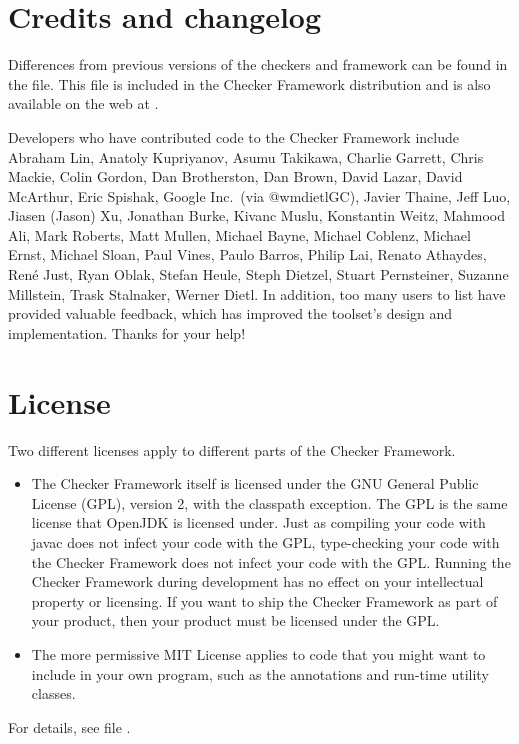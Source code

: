 \section{Credits and changelog\label{credits}}

Differences from previous versions of the checkers and framework can be found
in the  file.  This file is included in the
Checker Framework distribution and is also available on the web at
.

Developers who have contributed code to the Checker Framework include
%
Abraham Lin,
Anatoly Kupriyanov,
Asumu Takikawa,
Charlie Garrett,
Chris Mackie,
Colin Gordon,
Dan Brotherston,
Dan Brown,
David Lazar,
David McArthur,
Eric Spishak,
Google Inc.\ (via @wmdietlGC),
Javier Thaine,
Jeff Luo,
Jiasen (Jason) Xu,
Jonathan Burke,
Kivanc Muslu,
Konstantin Weitz,
Mahmood Ali,
Mark Roberts,
Matt Mullen,
Michael Bayne,
Michael Coblenz,
Michael Ernst,
Michael Sloan,
Paul Vines,
Paulo Barros,
Philip Lai,
Renato Athaydes,
Ren\'e Just,
Ryan Oblak,
Stefan Heule,
Steph Dietzel,
Stuart Pernsteiner,
Suzanne Millstein,
Trask Stalnaker,
Werner Dietl.
%
In addition, too many users to list have provided valuable feedback, which
has improved the toolset's design and implementation.
Thanks for your help!


\section{License\label{license}}

Two different licenses apply to different parts of the Checker Framework.
\begin{itemize}
\item
The Checker Framework itself is licensed under the GNU General Public License
(GPL), version 2, with the classpath exception.
The GPL is the same license that OpenJDK is licensed
under.  Just as compiling your code with javac does not infect your code
with the GPL, type-checking your code with the Checker Framework does not
infect your code with the GPL\@.  Running the Checker Framework during
development has no effect on your intellectual property or licensing.  If
you want to ship the Checker Framework as part of your product, then your
product must be licensed under the GPL\@.
\item
The more permissive MIT License applies
to code that you might want to include in your own
program, such as the annotations and run-time utility classes.
\end{itemize}
\noindent
For details, see file
.



